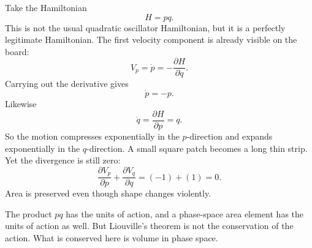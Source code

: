Take the Hamiltonian
\begin{equation}
H=pq.
\end{equation}
This is not the usual quadratic oscillator Hamiltonian, but it is a perfectly legitimate Hamiltonian. The first velocity component is already visible on the board:
\begin{equation}
V_p=\dot p=-\frac{\partial H}{\partial q}.
\end{equation}
Carrying out the derivative gives
\begin{equation}
\dot p=-p.
\end{equation}
Likewise
\begin{equation}
\dot q=\frac{\partial H}{\partial p}=q.
\end{equation}
So the motion compresses exponentially in the \(p\)-direction and expands exponentially in the \(q\)-direction. A small square patch becomes a long thin strip. Yet the divergence is still zero:
\begin{equation}
\frac{\partial V_p}{\partial p}+\frac{\partial V_q}{\partial q}
=
(-1)+(1)=0.
\end{equation}
Area is preserved even though shape changes violently.

\begin{remark}
The product \(pq\) has the units of action, and a phase-space area element has the units of action as well. But Liouville's theorem is not the conservation of the action. What is conserved here is volume in phase space.
\end{remark}

